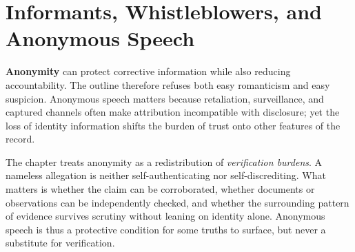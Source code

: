 
\chapter{Informants, Whistleblowers, and Anonymous Speech}
\label{ch:ch062}


\textbf{Anonymity} can protect corrective information while also reducing accountability. The outline therefore refuses both easy romanticism and easy suspicion. Anonymous speech matters because retaliation, surveillance, and captured channels often make attribution incompatible with disclosure; yet the loss of identity information shifts the burden of trust onto other features of the record.

The chapter treats anonymity as a redistribution of \emph{verification burdens}. A nameless allegation is neither self-authenticating nor self-discrediting. What matters is whether the claim can be corroborated, whether documents or observations can be independently checked, and whether the surrounding pattern of evidence survives scrutiny without leaning on identity alone. Anonymous speech is thus a protective condition for some truths to surface, but never a substitute for verification.
